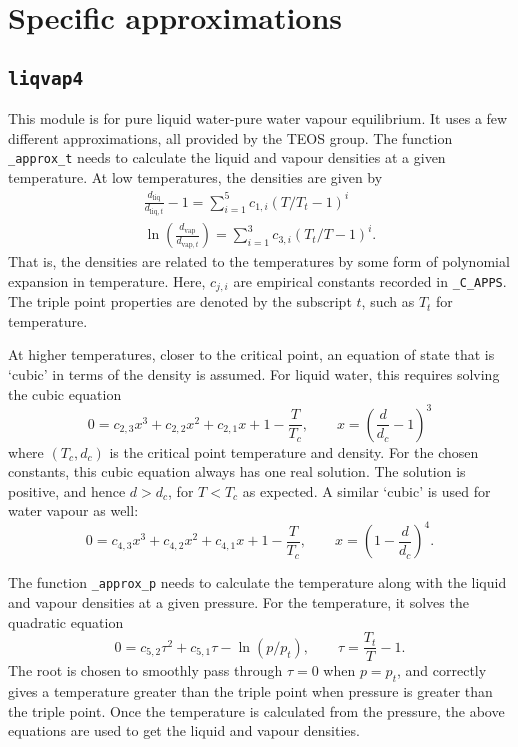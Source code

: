 \documentclass{article}
\newcommand{\liq}{\text{liq}}
\newcommand{\vap}{\text{vap}}
\begin{document}
\section{Specific approximations}


\subsection{\texttt{liqvap4}}

This module is for pure liquid water-pure water vapour equilibrium. It uses a few different approximations, all provided by the TEOS group. The function \texttt{\_approx\_t} needs to calculate the liquid and vapour densities at a given temperature. At low temperatures, the densities are given by
\begin{gather*}
    \frac{d_{\liq}}{d_{\liq,t}} - 1 = \sum_{i=1}^5 c_{1,i} (T/T_t - 1)^i \\
    \ln\left( \frac{d_{\vap}}{d_{\vap,t}} \right) = \sum_{i=1}^3 c_{3,i} (T_t/T - 1)^i.
\end{gather*}
That is, the densities are related to the temperatures by some form of polynomial expansion in temperature. Here, $c_{j,i}$ are empirical constants recorded in \texttt{\_C\_APPS}. The triple point properties are denoted by the subscript $t$, such as $T_t$ for temperature.

At higher temperatures, closer to the critical point, an equation of state that is `cubic' in terms of the density is assumed. For liquid water, this requires solving the cubic equation
\begin{equation*}
    0 = c_{2,3} x^3 + c_{2,2} x^2 + c_{2,1} x + 1 - \frac{T}{T_c}, \qquad x = \left( \frac{d}{d_c} - 1 \right)^3
\end{equation*}
where $(T_c,d_c)$ is the critical point temperature and density. For the chosen constants, this cubic equation always has one real solution. The solution is positive, and hence $d>d_c$, for $T<T_c$ as expected. A similar `cubic' is used for water vapour as well:
\begin{equation*}
    0 = c_{4,3} x^3 + c_{4,2} x^2 + c_{4,1} x + 1 - \frac{T}{T_c}, \qquad x = \left(1 - \frac{d}{d_c} \right)^4.
\end{equation*}

The function \texttt{\_approx\_p} needs to calculate the temperature along with the liquid and vapour densities at a given pressure. For the temperature, it solves the quadratic equation
\begin{equation*}
    0 = c_{5,2} \tau^2 + c_{5,1} \tau - \ln(p/p_t), \qquad \tau = \frac{T_t}{T} - 1.
\end{equation*}
The root is chosen to smoothly pass through $\tau=0$ when $p=p_t$, and correctly gives a temperature greater than the triple point when pressure is greater than the triple point. Once the temperature is calculated from the pressure, the above equations are used to get the liquid and vapour densities.
\end{document}
